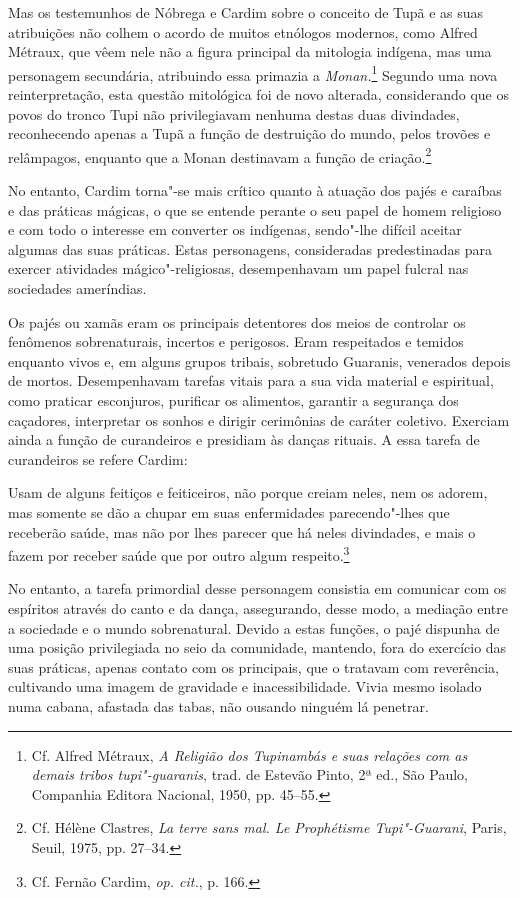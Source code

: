  Mas os testemunhos de Nóbrega e Cardim sobre o conceito de
Tupã e as suas atribuições não colhem o acordo de muitos
etnólogos modernos, como Alfred Métraux, que vêem nele não a figura
principal da mitologia indígena, mas uma personagem secundária,
atribuindo essa primazia a \textit{Monan.}\footnote{ Cf. Alfred
Métraux, \textit{A Religião dos Tupinambás e suas relações com as
demais tribos tupi"-guaranis}, trad. de Estevão Pinto, 2ª ed., São
Paulo, Companhia Editora Nacional, 1950, pp. 45--55.} Segundo uma
nova reinterpretação, esta questão mitológica foi de novo alterada,
considerando que os povos do tronco Tupi não privilegiavam nenhuma
destas duas divindades, reconhecendo apenas a Tupã a função de
destruição do mundo, pelos trovões e relâmpagos, enquanto que a Monan
destinavam a função de criação.\footnote{ Cf. Hélène Clastres,
\textit{La terre sans mal. Le Prophétisme Tupi"-Guarani}, Paris, Seuil,
1975, pp. 27--34.} 

No entanto, Cardim torna"-se mais crítico quanto à atuação dos pajés
e caraíbas e das práticas mágicas, o que se entende perante o seu papel
de homem religioso e com todo o interesse em converter os indígenas,
sendo"-lhe difícil aceitar algumas das suas práticas. Estas personagens,
consideradas predestinadas para exercer atividades mágico"-religiosas,
desempenhavam um papel fulcral nas sociedades ameríndias. 

 Os pajés ou xamãs eram os principais detentores dos meios de controlar
os fenômenos sobrenaturais, incertos e perigosos. Eram respeitados e
temidos enquanto vivos e, em alguns grupos tribais, sobretudo Guaranis,
venerados depois de mortos. Desempenhavam tarefas vitais para a sua
vida material e espiritual, como praticar esconjuros, purificar os
alimentos, garantir a segurança dos caçadores, interpretar os sonhos e
dirigir cerimônias de caráter coletivo. Exerciam ainda a função de
curandeiros e presidiam às danças rituais. A essa tarefa de curandeiros
se refere Cardim: 

\begin{hedraquote}
[\ldots] Usam de alguns feitiços e feiticeiros, não porque
creiam neles, nem os adorem, mas somente se dão a chupar em suas
enfermidades parecendo"-lhes que receberão saúde, mas não por lhes
parecer que há neles divindades, e mais o fazem por receber saúde que
por outro algum respeito.\footnote{ Cf. Fernão Cardim, \textit{op. cit.}, p. 166.}
\end{hedraquote}

 No entanto, a tarefa primordial desse personagem consistia em
comunicar com os espíritos através do canto e da dança, assegurando,
desse modo, a mediação entre a sociedade e o mundo sobrenatural. Devido
a estas funções, o pajé dispunha de uma posição privilegiada no seio da
comunidade, mantendo, fora do exercício das suas práticas, apenas
contato com os principais, que o tratavam com reverência, cultivando
uma imagem de gravidade e inacessibilidade. Vivia mesmo isolado numa
cabana, afastada das tabas, não ousando ninguém lá penetrar.

